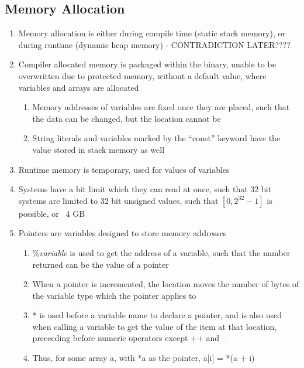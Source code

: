 \documentclass[11 pt, twoside]{article}
\begin{document}
\subsection{Memory Allocation}
\begin{enumerate}
\item Memory allocation is either during compile time (static stack memory), or during runtime (dynamic heap memory) - CONTRADICTION LATER????
\item Compiler allocated memory is packaged within the binary, unable to be overwritten due to protected memory, without a default value, where variables and arrays are allocated
\begin{enumerate}
\item Memory addresses of variables are fixed once they are placed, such that the data can be changed, but the location cannot be
\item String literals and variables marked by the ``const'' keyword have the value stored in stack memory as well
\end{enumerate}
\item Runtime memory is temporary, used for values of variables
\item Systems have a bit limit which they can read at once, such that 32 bit systems are limited to 32 bit unsigned values, such that $[0, 2^32-1]$ is possible, or ~4 GB 
\item Pointers are variables designed to store memory addresses
\begin{enumerate}
\item \%\textit{variable} is used to get the address of a variable, such that the number returned can be the value of a pointer 
\item When a pointer is incremented, the location moves the number of bytes of the variable type which the pointer applies to
\item * is used before a variable name to declare a pointer, and is also used when calling a variable to get the value of the item at that location, preceeding before numeric operators except ++ and --
\item Thus, for some array a, with *a as the pointer, a[i] = *(a + i)
\end{enumerate}
\end{enumerate}
\end{document}
